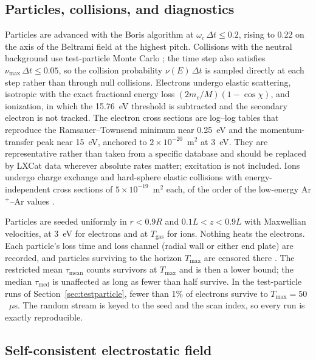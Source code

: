 \documentclass[11pt]{article}
\newcommand{\us}{\ensuremath{\mu}s}
\begin{document}
\subsection{Particles, collisions, and diagnostics}
\label{sec:particles}

Particles are advanced with the Boris algorithm \cite{boris1970,qin2013,birdsallLangdon} at $\omega_c\,\Delta t \le 0.2$, rising to 0.22 on the axis of the Beltrami field at the highest pitch. Collisions with the neutral background use test-particle Monte Carlo \cite{birdsall1991,vahedi1995}; the time step also satisfies $\nu_{\max}\,\Delta t \le 0.05$, so the collision probability $\nu(E)\,\Delta t$ is sampled directly at each step rather than through null collisions. Electrons undergo elastic scattering, isotropic with the exact fractional energy loss $(2m_e/M)(1-\cos\chi)$, and ionization, in which the 15.76~eV threshold is subtracted and the secondary electron is not tracked. The electron cross sections are log--log tables that reproduce the Ramsauer--Townsend minimum near 0.25~eV and the momentum-transfer peak near 15~eV, anchored to $2\times10^{-20}$~m$^2$ at 3~eV. They are representative rather than taken from a specific database and should be replaced by LXCat data \cite{pitchford2017} wherever absolute rates matter; excitation is not included. Ions undergo charge exchange and hard-sphere elastic collisions with energy-independent cross sections of $5\times10^{-19}$~m$^2$ each, of the order of the low-energy Ar$^+$--Ar values \cite{phelps1994}.

Particles are seeded uniformly in $r < 0.9R$ and $0.1L < z < 0.9L$ with Maxwellian velocities, at 3~eV for electrons and at $T_{\mathrm{gas}}$ for ions. Nothing heats the electrons. Each particle's loss time and loss channel (radial wall or either end plate) are recorded, and particles surviving to the horizon $T_{\max}$ are censored there \cite{kaplan1958}. The restricted mean $\tau_{\mathrm{mean}}$ counts survivors at $T_{\max}$ and is then a lower bound; the median $\tau_{\mathrm{med}}$ is unaffected as long as fewer than half survive. In the test-particle runs of Section~\ref{sec:testparticle}, fewer than 1\% of electrons survive to $T_{\max} = 50$~\us. The random stream is keyed to the seed and the scan index, so every run is exactly reproducible.

\subsection{Self-consistent electrostatic field}
\label{sec:poisson}
\end{document}
